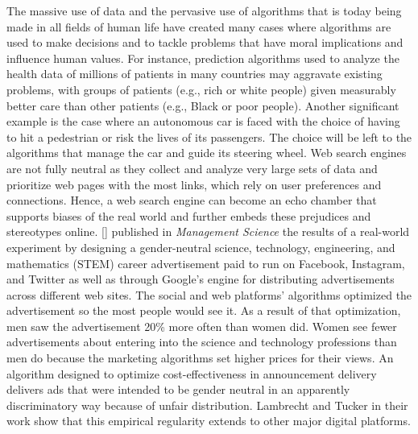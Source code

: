 The massive use of data and the pervasive use of algorithms that is today being made in all fields of human life have created many cases where algorithms are used to make decisions and to tackle problems that have moral implications and influence human values. For instance, prediction algorithms used to analyze the health data of millions of patients in many countries may aggravate existing problems, with groups of patients (e.g., rich or white people) given measurably better care than other patients (e.g., Black or poor people). Another significant example is the case where an autonomous car is faced with the choice of having to hit a pedestrian or risk the lives of its passengers. The choice will be left to the algorithms that manage the car and guide its steering wheel. Web search engines are not fully neutral as they collect and analyze very large sets of data and prioritize web pages with the most links, which rely on user preferences and connections. Hence, a web search engine can become an echo chamber that supports biases of the real world and further embeds these prejudices and stereotypes online. \mbox{\citeauthor{chap:7:LambrechtandTucker:2019}} \mbox{[\citeyear{chap:7:LambrechtandTucker:2019}]} published in \textit{Management Science} the results of a real-world experiment by designing a gender-neutral science, technology,\vadjust{\vspace*{-18pt}\pagebreak} engineering, and \hbox{mathematics} (STEM) career advertisement paid to run on Facebook, Instagram, and Twitter as well as through Google's engine for distributing advertisements across different web sites. The social and web platforms' algorithms optimized the advertisement so the most people would see it. As a result of that optimization, men saw the advertisement 20\% more often than women did. Women see fewer advertisements about entering into the science and technology professions than men do because the marketing algorithms set higher prices for their views. An algorithm designed to optimize cost-effectiveness in announcement delivery delivers ads that were intended to be gender neutral in an apparently discriminatory way because of unfair distribution. Lambrecht and Tucker in their work show that this empirical regularity extends to other major digital platforms.

